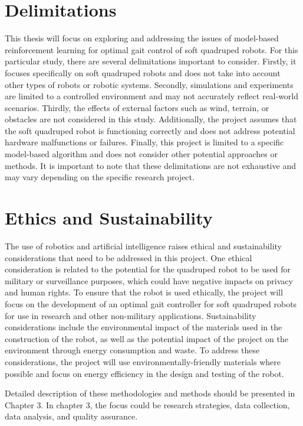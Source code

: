 \section{Delimitations}
 This thesis will focus on exploring and addressing the issues of model-based reinforcement learning for optimal gait control of soft quadruped robots. For this particular study, there are several delimitations important to consider. Firstly, it focuses specifically on soft quadruped robots and does not take into account other types of robots or robotic systems. Secondly, simulations and experiments are limited to a controlled environment and may not accurately reflect real-world scenarios. Thirdly, the effects of external factors such as wind, terrain, or obstacles are not considered in this study. Additionally, the project assumes that the soft quadruped robot is functioning correctly and does not address potential hardware malfunctions or failures. Finally, this project is limited to a specific model-based  algorithm and does not consider other potential approaches or methods. It is important to note that these delimitations are not exhaustive and may vary depending on the specific research project. 
 
\section{Ethics and Sustainability}
The use of robotics and artificial intelligence raises ethical and sustainability considerations that need to be addressed in this project. One ethical consideration is related to the potential for the quadruped robot to be used for military or surveillance purposes, which could have negative impacts on privacy and human rights. To ensure that the robot is used ethically, the project will focus on the development of an optimal gait controller for soft quadruped robots for use in research and other non-military applications. Sustainability considerations include the environmental impact of the materials used in the construction of the robot, as well as the potential impact of the project on the environment through energy consumption and waste. To address these considerations, the project will use environmentally-friendly materials where possible and focus on energy efficiency in the design and testing of the robot.

Detailed description of these methodologies and methods should be presented in Chapter 3. In chapter 3, the focus could be research strategies, data collection, data analysis, and quality assurance.

